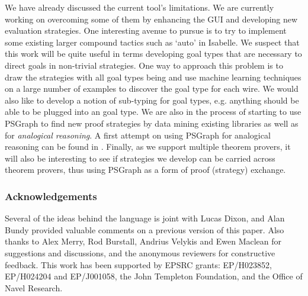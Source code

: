 \documentclass{llncs}
\begin{document}
We have already discussed the current tool's limitations. We are currently working on overcoming some of them by
enhancing the GUI and developing new evaluation strategies. One interesting avenue to pursue is to try to implement some
existing larger compound tactics such as `auto' in Isabelle. We suspect that this work will be quite useful in terms
developing goal types that are necessary to direct goals in non-trivial strategies. One way to approach this problem is
to draw the strategies with all goal types being  and use machine learning techniques on a large number of examples
to discover the goal type for each wire. We would also like to develop a notion of sub-typing for goal types, e.g.
anything should be able to be plugged into an  goal type. We are also in the process of starting to use PSGraph to
find new proof strategies by data mining existing libraries as well as for \emph{analogical reasoning}. A first attempt
on using PSGraph for analogical reasoning can be found in \cite{grov13a}. Finally, as we support multiple theorem
provers, it will also be interesting to see if strategies we develop can be carried across theorem provers, thus using
PSGraph as a form of proof (strategy) exchange.


\vspace{-1em}
{\small
\subsubsection*{\footnotesize Acknowledgements} Several of the ideas behind the language is joint with Lucas Dixon, and Alan Bundy provided valuable comments on a
previous version of this paper.  Also thanks to Alex Merry, Rod Burstall, 
Andrius Velykis and Ewen Maclean for suggestions and discussions, and the anonymous   reviewers for constructive feedback. This work has been supported by EPSRC grants: EP/H023852, EP/H024204 and EP/J001058, the John Templeton Foundation, and the Office of Navel Research.
}
\vspace{-1em}


\begin{small}


\end{small}
\end{document}
